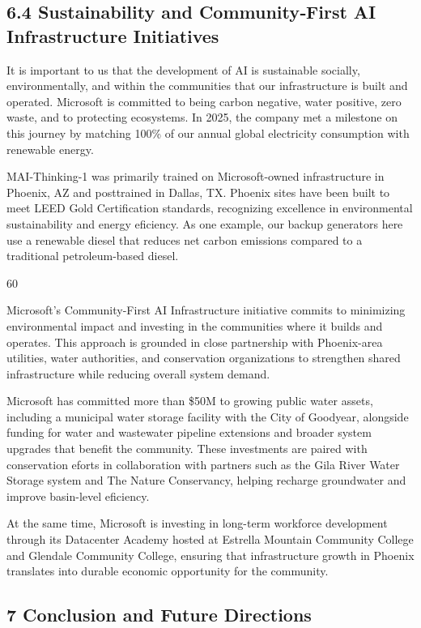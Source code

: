 \documentclass[
  10
]{article}
\begin{document}
\subsection{6.4 Sustainability and Community‐First AI Infrastructure
Initiatives}\label{sustainability-and-communityfirst-ai-infrastructure-initiatives}

It is important to us that the development of AI is sustainable
socially, environmentally, and within the communities that our
infrastructure is built and operated. Microsoft is committed to being
carbon negative, water positive, zero waste, and to protecting
ecosystems. In 2025, the company met a milestone on this journey by
matching 100\% of our annual global electricity consumption with
renewable energy.

MAI-Thinking-1 was primarily trained on Microsoft-owned infrastructure
in Phoenix, AZ and posttrained in Dallas, TX. Phoenix sites have been
built to meet LEED Gold Certification standards, recognizing excellence
in environmental sustainability and energy eficiency. As one example,
our backup generators here use a renewable diesel that reduces net
carbon emissions compared to a traditional petroleum-based diesel.

60

Microsoft's Community-First AI Infrastructure initiative commits to
minimizing environmental impact and investing in the communities where
it builds and operates. This approach is grounded in close partnership
with Phoenix-area utilities, water authorities, and conservation
organizations to strengthen shared infrastructure while reducing overall
system demand.

Microsoft has committed more than \$50M to growing public water assets,
including a municipal water storage facility with the City of Goodyear,
alongside funding for water and wastewater pipeline extensions and
broader system upgrades that benefit the community. These investments
are paired with conservation eforts in collaboration with partners such
as the Gila River Water Storage system and The Nature Conservancy,
helping recharge groundwater and improve basin-level eficiency.

At the same time, Microsoft is investing in long-term workforce
development through its Datacenter Academy hosted at Estrella Mountain
Community College and Glendale Community College, ensuring that
infrastructure growth in Phoenix translates into durable economic
opportunity for the community.

\subsection{7 Conclusion and Future
Directions}\label{conclusion-and-future-directions}
\end{document}
